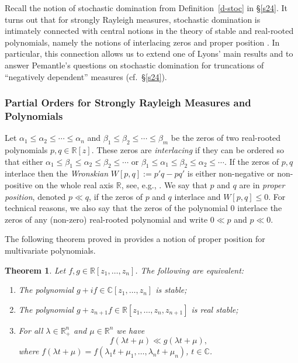 \documentclass[10pt,reqno]{amsart}
\theoremstyle{plain}
\newtheorem{theorem}{Theorem}[section]
\theoremstyle{definition}
\theoremstyle{remark}
\newcommand{\RR}{\mathbb{R}}
\newcommand{\CC}{\mathbb{C}}
\begin{document}
Recall the notion of stochastic domination from Definition~\ref{d-stoc} in 
\S \ref{s24}. 
It turns out that for strongly Rayleigh measures, stochastic domination is 
intimately connected with central notions in the theory of stable and 
real-rooted polynomials, namely the notions of interlacing zeros and 
proper position \cite{BBS,BBS1,BBS2,PB,Le,RS}. In particular, this connection
allows us to extend one of Lyons' main results \cite{Lyons} and to answer
Pemantle's questions on stochastic domination for truncations of ``negatively
dependent'' measures \cite{P} (cf.~\S \ref{s24}).

\subsubsection{Partial Orders for Strongly Rayleigh Measures and 
Polynomials}\label{sss-stoc}

Let $\alpha_1 \leq \alpha_2 \leq \cdots \leq \alpha_n$ and 
$\beta_1 \leq \beta_2 \leq \cdots \leq \beta_m$ be the zeros of two 
real-rooted polynomials $p,q \in \RR[z]$. These zeros are  
{\em interlacing} if they can 
be ordered so that either   $\alpha_1 \leq \beta_1 \leq \alpha_2 \leq 
\beta_2 \leq 
\cdots$ or $\beta_1 \leq \alpha_1 \leq \beta_2 \leq \alpha_2 \leq 
\cdots$. If 
the zeros of $p,q$ interlace then 
the {\em Wronskian} 
$W[p,q]:=p'q-pq'$ is either non-negative or non-positive on the whole
 real axis 
$\RR$, see, e.g., \cite{Le,RS}. 
We say that $p$ and $q$ 
are  in  
{\em proper position}, denoted $p \ll q$, if the zeros of $p$ and $q$ 
interlace and 
 $W[p,q] \leq 0$. For technical reasons, we also say that the zeros of the 
polynomial $0$ 
interlace the zeros of any (non-zero) real-rooted polynomial and write 
$0 \ll p$ and $p \ll 0$. 

The following theorem proved in \cite{BBS2} 
provides a notion of proper position for  multivariate polynomials. 

\begin{theorem}\label{addz}
Let $f, g \in \RR[z_1,\ldots,z_n]$. The following are equivalent: 
\begin{enumerate}
\item The polynomial $g+if \in \CC[z_1,\ldots,z_n]$ is stable; 
\item The polynomial $g+z_{n+1}f \in \RR[z_1,\ldots,z_n,z_{n+1}]$ is 
real stable; 
\item For all $\lambda \in \RR_+^n$ and $\mu \in \RR^n$ we have 
$$
f(\lambda t + \mu) \ll g(\lambda t + \mu),  
$$
where $f(\lambda t + \mu)
=f(\lambda_1 t+\mu_1, \ldots, \lambda_n t+\mu_n)$, $t\in\CC$.
\end{enumerate}
\end{theorem}
\end{document}
